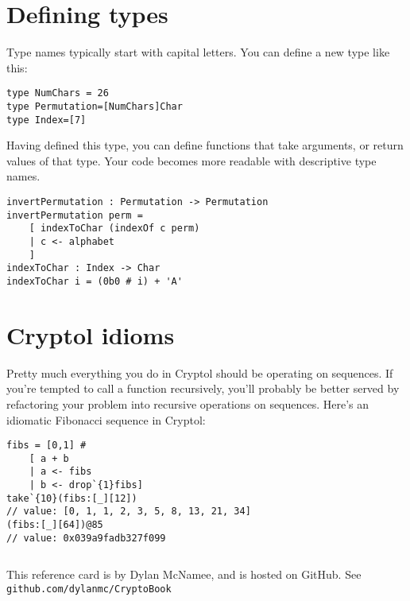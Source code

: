\documentclass[9pt,letter]{article}
\begin{document}
\section{Defining types}
Type names typically start with capital letters. You can define a new type like this:
\begin{verbatim}
type NumChars = 26
type Permutation=[NumChars]Char
type Index=[7]
\end{verbatim}
Having defined this type, you can define functions that take
arguments, or return values of that type. Your code becomes more
readable with descriptive type names.
\begin{verbatim}
invertPermutation : Permutation -> Permutation
invertPermutation perm =
    [ indexToChar (indexOf c perm)
    | c <- alphabet
    ]
indexToChar : Index -> Char
indexToChar i = (0b0 # i) + 'A'
\end{verbatim}
\section{Cryptol idioms}
Pretty much everything you do in Cryptol should be operating on sequences.
If you're tempted to call a function recursively, you'll probably be better served by refactoring your problem into recursive operations on sequences. Here's an idiomatic Fibonacci sequence in Cryptol:
\begin{verbatim}
fibs = [0,1] #
    [ a + b
    | a <- fibs
    | b <- drop`{1}fibs]
take`{10}(fibs:[_][12])
// value: [0, 1, 1, 2, 3, 5, 8, 13, 21, 34]
(fibs:[_][64])@85
// value: 0x039a9fadb327f099
\end{verbatim}
\begin{verbatim}
\end{verbatim}

\baselineskip
This reference card is by Dylan McNamee,
and is hosted on GitHub. See \verb+github.com/dylanmc/CryptoBook+
\end{document}
